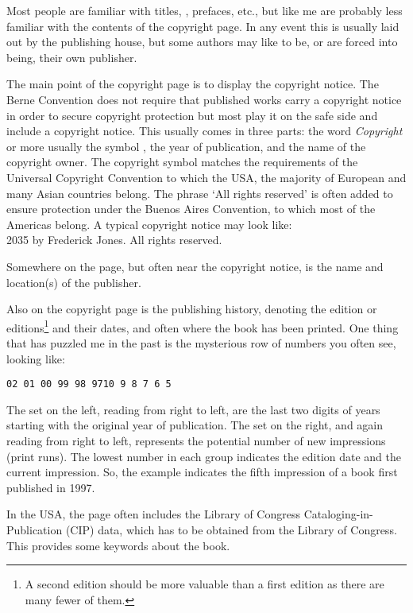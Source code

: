 \documentclass[10pt,a4paper,extrafontsizes]{memoir}
\begin{document}
\begin{paracol}{2}
\switchEng
    Most people are familiar with titles, \toc, prefaces, etc., but like
me are probably
less familiar with the contents of the copyright page. 
In any event this is
usually laid out by the publishing house, but some authors may like to be,
or are forced into being, their own publisher.

    The main point of the copyright page is to display the 
copyright notice.
The Berne Convention does not require that published works carry a copyright
notice in order to secure copyright protection but most play it on the safe
side and include a copyright notice.
This usually comes in three parts: the word \textit{Copyright} or more usually
the symbol \textcopyright, 
the year of publication, 
and the name of the copyright owner.
The copyright symbol matches the requirements of the Universal Copyright
Convention to which the USA, the majority of European and many Asian
countries belong.
The phrase `All rights reserved' is often added to ensure protection under the
Buenos Aires Convention, to which most of the Americas belong. A typical
copyright notice may look like: \\
{\footnotesize \textcopyright{} 2035 by Frederick Jones. All rights reserved.}

    Somewhere on the page, but often near the copyright notice, is the name 
and location(s) of the publisher.

    Also on the copyright page is the publishing history, denoting the edition
or editions\footnote{A second edition should be more valuable than a first
edition as there are many fewer of them.} and their dates, 
and often where the book has been printed. One thing that has puzzled me in
the past is the mysterious row of numbers you often see, looking like: \\
\centerline{\footnotesize\texttt{02 01 00 99 98 97\hspace{2em}10 9 8 7 6 5}}
The set on the left, reading from right to left, are the last two digits
of years starting with the original year of publication.
The set on the right, and again reading from right to left, represents the
potential number of new impressions (print runs). The lowest number in each 
group indicates the edition date and the current impression. So, the example
indicates the fifth impression of a book first published in 1997.

    In the USA, the page often includes the Library of Congress 
Cataloging-in-Publication (CIP) data, 
which has to be obtained from the
Library of Congress. This provides some keywords about the book.


\end{paracol}
\end{document}
